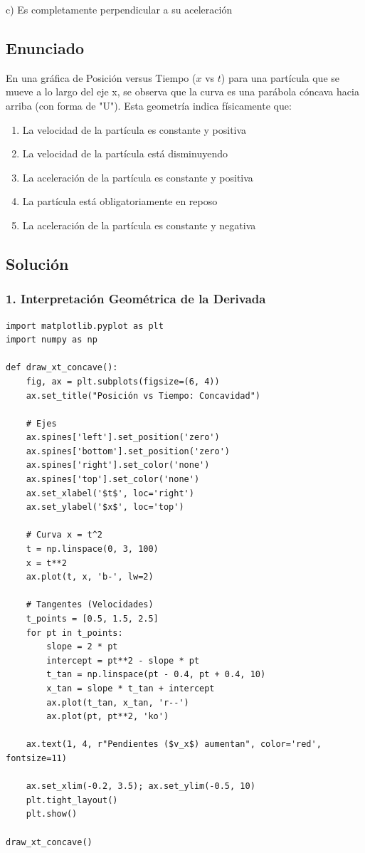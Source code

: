 \documentclass[12pt, a4paper]{article}
\begin{document}
\begin{tcolorbox}[colback=green!5!white, colframe=green!50!black, title=Respuesta Final]
\centering \Large c) Es completamente perpendicular a su aceleración
\end{tcolorbox}

\newpage

\subsection*{Enunciado}
En una gráfica de Posición versus Tiempo ($x$ vs $t$) para una partícula que se mueve a lo largo del eje x, se observa que la curva es una parábola cóncava hacia arriba (con forma de "U"). Esta geometría indica físicamente que:
\begin{enumerate}[label=\alph*)]
    \item La velocidad de la partícula es constante y positiva
    \item La velocidad de la partícula está disminuyendo
    \item La aceleración de la partícula es constante y positiva
    \item La partícula está obligatoriamente en reposo
    \item La aceleración de la partícula es constante y negativa
\end{enumerate}

\subsection*{Solución}

\subsubsection*{1. Interpretación Geométrica de la Derivada}

\begin{lstlisting}
import matplotlib.pyplot as plt
import numpy as np

def draw_xt_concave():
    fig, ax = plt.subplots(figsize=(6, 4))
    ax.set_title("Posición vs Tiempo: Concavidad")
    
    # Ejes
    ax.spines['left'].set_position('zero')
    ax.spines['bottom'].set_position('zero')
    ax.spines['right'].set_color('none')
    ax.spines['top'].set_color('none')
    ax.set_xlabel('$t$', loc='right')
    ax.set_ylabel('$x$', loc='top')
    
    # Curva x = t^2
    t = np.linspace(0, 3, 100)
    x = t**2
    ax.plot(t, x, 'b-', lw=2)
    
    # Tangentes (Velocidades)
    t_points = [0.5, 1.5, 2.5]
    for pt in t_points:
        slope = 2 * pt
        intercept = pt**2 - slope * pt
        t_tan = np.linspace(pt - 0.4, pt + 0.4, 10)
        x_tan = slope * t_tan + intercept
        ax.plot(t_tan, x_tan, 'r--')
        ax.plot(pt, pt**2, 'ko')
    
    ax.text(1, 4, r"Pendientes ($v_x$) aumentan", color='red', fontsize=11)
    
    ax.set_xlim(-0.2, 3.5); ax.set_ylim(-0.5, 10)
    plt.tight_layout()
    plt.show()

draw_xt_concave()
\end{lstlisting}
\end{document}
